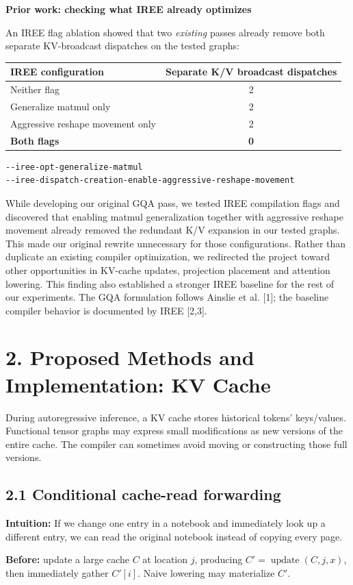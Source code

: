 \documentclass[10pt,a4paper]{article}
\newcommand{\smallhead}[1]{\vspace{5pt}\textbf{#1}\par}
\begin{document}
\smallhead{Prior work: checking what IREE already optimizes}
An IREE flag ablation showed that two \emph{existing} passes already remove both separate KV-broadcast dispatches on the tested graphs:
\begin{center}\small
\begin{tabular}{lc}\toprule
IREE configuration & Separate K/V broadcast dispatches \\\midrule
Neither flag & 2\\
Generalize matmul only & 2\\
Aggressive reshape movement only & 2\\
\textbf{Both flags} & \textbf{0}\\\bottomrule
\end{tabular}
\end{center}
\vspace{-4pt}
\begin{lstlisting}
--iree-opt-generalize-matmul
--iree-dispatch-creation-enable-aggressive-reshape-movement
\end{lstlisting}
While developing our original GQA pass, we tested IREE compilation flags and discovered that enabling matmul generalization together with aggressive reshape movement already removed the redundant K/V expansion in our tested graphs. This made our original rewrite unnecessary for those configurations. Rather than duplicate an existing compiler optimization, we redirected the project toward other opportunities in KV-cache updates, projection placement and attention lowering. This finding also established a stronger IREE baseline for the rest of our experiments. The GQA formulation follows Ainslie et al. [1]; the baseline compiler behavior is documented by IREE [2,3].


\section*{2. Proposed Methods and Implementation: KV Cache}
During autoregressive inference, a KV cache stores historical tokens' keys/values. Functional tensor graphs may express small modifications as new versions of the entire cache. The compiler can sometimes avoid moving or constructing those full versions.

\subsection*{2.1 Conditional cache-read forwarding}
\textbf{Intuition:} If we change one entry in a notebook and immediately look up a different entry, we can read the original notebook instead of copying every page.\par\textbf{Before:} update a large cache $C$ at location $j$, producing $C'=\operatorname{update}(C,j,x)$, then immediately gather $C'[i]$. Naive lowering may materialize $C'$.
\end{document}
